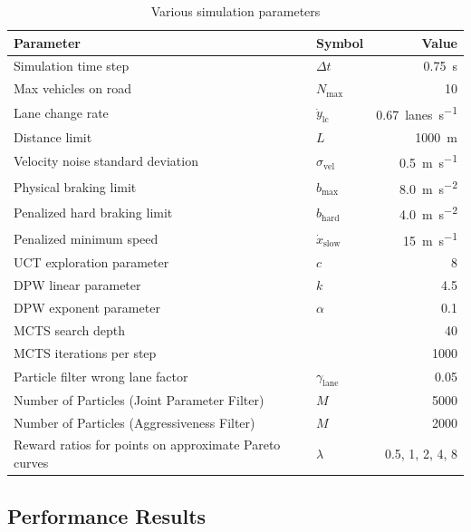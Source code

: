 \begin{table}[tbph]
    \caption{Various simulation parameters}
    \center
    \begin{tabular}{@{}llr@{}}
        \toprule
            Parameter & Symbol & Value \\
        \midrule
            Simulation time step & $\Delta t$ & \SI{0.75}{\second} \\
            Max vehicles on road & $N_\text{max}$ & \num{10} \\
            Lane change rate & $\dot{y}_\text{lc}$ & \SI{0.67}{lanes\per\second} \\
            Distance limit & $L$ & \SI{1000}{\meter} \\
            Velocity noise standard deviation & $\sigma_\text{vel}$ & \SI{0.5}{\meter\per\second} \\
            Physical braking limit & $b_\text{max}$ & \SI{8.0}{\meter\per\second\squared} \\
            Penalized hard braking limit & $b_\text{hard}$ & \SI{4.0}{\meter\per\second\squared} \\
            Penalized minimum speed & $\dot{x}_\text{slow}$ & \SI{15}{\meter\per\second} \\
            UCT exploration parameter & $c$ & 8 \\
            DPW linear parameter & $k$ & 4.5 \\
            DPW exponent parameter & $\alpha$ & 0.1 \\
            MCTS search depth & & 40 \\
            MCTS iterations per step & & 1000 \\
            Particle filter wrong lane factor & $\gamma_\text{lane}$ & 0.05 \\
            Number of Particles (Joint Parameter Filter) & $M$ & 5000 \\
            Number of Particles (Aggressiveness Filter) & $M$ & 2000 \\
            Reward ratios for points on approximate Pareto curves & $\lambda$ & 0.5, 1, 2, 4, 8 \\
        \bottomrule
    \end{tabular}
    \label{tab:params}
\end{table}

\subsection{Performance Results}

